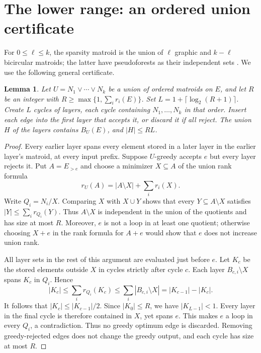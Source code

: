 \documentclass[11pt,a4paper]{article}
\newtheorem{lemma}[theorem]{Lemma}
\theoremstyle{definition}
\theoremstyle{remark}
\begin{document}
\section{The lower range: an ordered union certificate}
\label{sec:lower}

For $0\leq\ell\leq k$, the sparsity matroid is the union of
$\ell$ graphic and $k-\ell$ bicircular matroids; the latter
have pseudoforests as their independent sets
\cite{recognition}. We use the following general certificate.

\begin{lemma}\label{lem:union-certificate}
Let $U=N_1\vee\cdots\vee N_k$ be a union of ordered matroids
on $E$, and let $R$ be an integer with
$R\geq\max\{1,\sum_i r_i(E)\}$.
Set $L=1+\lceil\log_2(R+1)\rceil$.
Create $L$ cycles of layers, each cycle containing
$N_1,\ldots,N_k$ in that order. Insert each edge into the
first layer that accepts it, or discard it if all reject.
The union $H$ of the layers contains $B_U(E)$, and
$|H|\leq RL$.
\end{lemma}
\begin{proof}
Every earlier layer spans every element stored in a later
layer in the earlier layer's matroid, at every input prefix.
Suppose $U$-greedy accepts $e$ but every layer rejects it.
Put $A=E_{>e}$ and choose a minimizer $X\subseteq A$ of
the union rank formula
\[
 r_U(A)=|A\setminus X|+\sum_i r_i(X).
\]
Write $Q_i=N_i/X$. Comparing $X$ with $X\cup Y$ shows that
every $Y\subseteq A\setminus X$ satisfies
$|Y|\leq\sum_i r_{Q_i}(Y)$.
Thus $A\setminus X$ is independent in the union of the
quotients and has size at most $R$.
Moreover, $e$ is not a loop in at least one quotient;
otherwise choosing $X+e$ in the rank formula for $A+e$
would show that $e$ does not increase union rank.

All layer sets in the rest of this argument are evaluated just
before $e$. Let $K_c$ be the stored elements outside $X$ in cycles
strictly after cycle $c$. Each layer $B_{c,i}\setminus X$
spans $K_c$ in $Q_i$. Hence
\[
 |K_c|\leq\sum_i r_{Q_i}(K_c)
 \leq\sum_i|B_{c,i}\setminus X|
 =|K_{c-1}|-|K_c|.
\]
It follows that $|K_c|\leq |K_{c-1}|/2$.
Since $|K_0|\leq R$, we have $|K_{L-1}|<1$.
Every layer in the final cycle is therefore contained
in $X$, yet spans $e$. This makes $e$ a loop in every
$Q_i$, a contradiction.
Thus no greedy optimum edge is discarded. Removing
greedy-rejected edges does not change the greedy output,
and each cycle has size at most $R$.
\end{proof}
\end{document}
